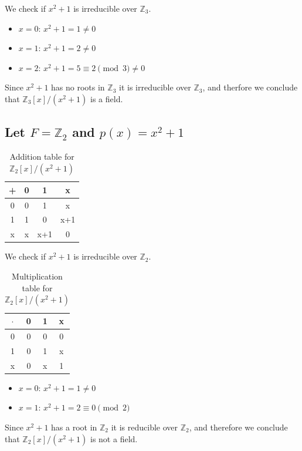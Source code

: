 \documentclass{article}
\begin{document}
We check if $x^2 + 1$ is irreducible over $\mathbb{Z}_3$.

\begin{itemize}
    \item $x=0$: $x^2 + 1 = 1 \neq 0$
    \item $x=1$: $x^2 + 1 = 2 \neq 0$
    \item $x=2$: $x^2 + 1 = 5 \equiv 2 \pmod{3} \neq 0$
\end{itemize}
Since $x^2 + 1$ has no roots in $\mathbb{Z}_3$ it is irreducible over $\mathbb{Z}_3$, and therfore
we conclude that $\mathbb{Z}_3[x] / (x^2+1)$ is a field.


\subsection{Let $F = \mathbb{Z}_2$ and $p(x) = x^2 + 1$}

\begin{table}[H]
    \centering
    \begin{tabular}{c|ccc}
        + & 0 & 1 & x \\
        \hline
        0 & 0 & 1 & x \\
        1 & 1 & 0 & x+1 \\
        x & x & x+1 & 0 \\
    \end{tabular}
    \caption{Addition table for \(\mathbb{Z}_2[x] / (x^2+1)\)}
\end{table}
We check if $x^2 + 1$ is irreducible over $\mathbb{Z}_2$.

\begin{table}[H]
    \centering
    \begin{tabular}{c|ccc}
        $\cdot$ & 0 & 1 & x \\
        \hline
        0 & 0 & 0 & 0 \\
        1 & 0 & 1 & x \\
        x & 0 & x & 1 \\
    \end{tabular}
    \caption{Multiplication table for \(\mathbb{Z}_2[x] / (x^2+1)\)}
\end{table}

\begin{itemize}
    \item $x=0$: $x^2 + 1 = 1 \neq 0$
    \item $x=1$: $x^2 + 1 = 2 \equiv 0 \pmod{2}$
\end{itemize}
Since $x^2 + 1$ has a root in $\mathbb{Z}_2$ it is reducible over $\mathbb{Z}_2$, and therefore
we conclude that $\mathbb{Z}_2[x] / (x^2+1)$ is not a field.
\end{document}
